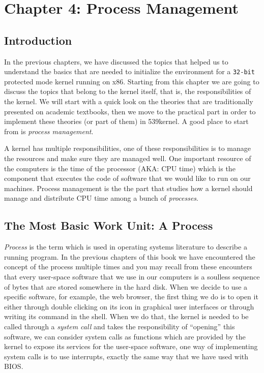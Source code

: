 \chapter{Chapter 4: Process Management}\label{ch-process-management}

\section{Introduction}\label{introduction}

In the previous chapters, we have discussed the topics that helped us to
understand the basics that are needed to initialize the environment for
a \lstinline!32-bit! protected mode kernel running on x86. Starting from
this chapter we are going to discuss the topics that belong to the
kernel itself, that is, the responsibilities of the kernel. We will
start with a quick look on the theories that are traditionally presented
on academic textbooks, then we move to the practical part in order to
implement these theories (or part of them) in 539kernel. A good place to
start from is \emph{process management}.

A kernel has multiple responsibilities, one of these responsibilities is
to manage the resources and make sure they are managed well. One
important resource of the computers is the time of the processor (AKA:
CPU time) which is the component that executes the code of software that
we would like to run on our machines. Process management is the the part
that studies how a kernel should manage and distribute CPU time among a
bunch of \emph{processes}.

\section{The Most Basic Work Unit: A
Process}\label{the-most-basic-work-unit-a-process}

\emph{Process} is the term which is used in operating systems literature
to describe a running program. In the previous chapters of this book we
have encountered the concept of the process multiple times and you may
recall from these encounters that every user-space software that we use
in our computers is a soulless sequence of bytes that are stored
somewhere in the hard disk. When we decide to use a specific software,
for example, the web browser, the first thing we do is to open it either
through double clicking on its icon in graphical user interfaces or
through writing its command in the shell. When we do that, the kernel is
needed to be called through a \emph{system call} and takes the
responsibility of ``opening'' this software, we can consider system
calls as functions which are provided by the kernel to expose its
services for the user-space software, one way of implementing system
calls is to use interrupts, exactly the same way that we have used with
BIOS.

